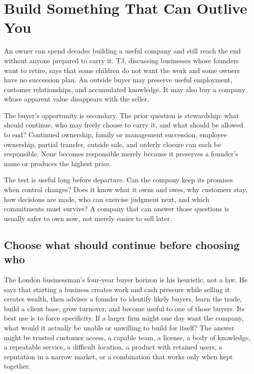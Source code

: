 \chapter{Build Something That Can Outlive You}

An owner can spend decades building a useful company and still reach the end
without anyone prepared to carry it. TJ, discussing businesses whose founders
want to retire, says that some children do not want the work and some owners
have no succession plan. An outside buyer may preserve useful employment,
customer relationships, and accumulated knowledge. It may also buy a company
whose apparent value disappears with the seller.

The buyer's opportunity is secondary. The prior question is stewardship: what
should continue, who may freely choose to carry it, and what should be allowed
to end? Continued ownership, family or management succession, employee
ownership, partial transfer, outside sale, and orderly closure can each be
responsible. None becomes responsible merely because it preserves a founder's
name or produces the highest price.

The test is useful long before departure. Can the company keep its promises
when control changes? Does it know what it owns and owes, why customers stay,
how decisions are made, who can exercise judgment next, and which commitments
must survive? A company that can answer those questions is usually safer to
own now, not merely easier to sell later.

\section{Choose what should continue before choosing who}

The London businessman's four-year buyer horizon is his heuristic, not a law.
He says that starting a business creates work and cash pressure while selling
it creates wealth, then advises a founder to identify likely buyers, learn the
trade, build a client base, grow turnover, and become useful to one of those
buyers. Its best use is to force specificity. If a larger firm might one day
want the company, what would it actually be unable or unwilling to build for
itself? The answer might be trusted customer access, a capable team, a license,
a body of knowledge, a repeatable service, a difficult location, a product
with retained users, a reputation in a narrow market, or a combination that
works only when kept together.

